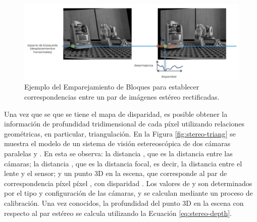 \begin{figure}[H]
    \centering
    \includegraphics[scale=0.4]{partes/img/block-matching.png}
    \caption[Ejemplo del Emparejamiento de Bloques para establecer correspondencias entre un par de imágenes estéreo rectificadas.]{Ejemplo del Emparejamiento de Bloques para establecer correspondencias entre un par de imágenes estéreo rectificadas\footnotemark.} 
    \label{fig:stereo-block-matching}
\end{figure}

Una vez que se que se tiene el mapa de disparidad, es posible obtener la información de profundidad tridimensional de cada píxel utilizando relaciones geométricas, en particular, triangulación. En la Figura \ref{fig:stereo-triang} se muestra el modelo de un sistema de visión estereoscópica de dos cámaras paralelas  y . En esta se observa: la distancia , que es la distancia entre las cámaras; la distancia , que es la distancia focal, es decir, la distancia entre el lente y el sensor; y un punto 3D en la escena, que corresponde al par de correspondencia píxel píxel ,  con disparidad . Los valores de  y  son determinados por el tipo y configuración de las cámaras, y se calculan mediante un proceso de calibración. Una vez conocidos, la profundidad  del punto 3D en la escena con respecto al par estéreo se calcula utilizando la Ecuación \ref{eq:stereo-depth}. 

